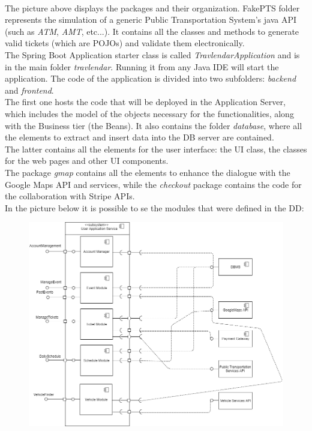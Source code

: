\documentclass{article}
\begin{document}
			\paragraph{}
The picture above displays the packages and their organization. FakePTS folder represents the simulation of a generic Public Transportation System's java API (such as \textit{ATM}, \textit{AMT}, etc...). It contains all the classes and methods to generate valid tickets (which are POJOs) and validate them electronically.\\ The Spring Boot Application starter class is called \textit{TravlendarApplication} and is in the main folder \textit{travlendar}. Running it from any Java IDE will start the application. The code of the application is divided into two subfolders: \textit{backend} and \textit{frontend}.\\The first one hosts the code that will be deployed in the Application Server, which includes the model of the objects necessary for the functionalities, along with the Business tier (the Beans). It also contains the folder \textit{database}, where all the elements to extract and insert data into the DB server are contained.\\The latter contains all the elements for the user interface: the UI class, the classes for the web pages and other UI components.\\The package \textit{gmap} contains all the elements to enhance the dialogue with the Google Maps API and services, while the \textit{checkout} package contains the code for the collaboration with Stripe APIs.\\In the picture below it is possible to se the modules that were defined in the DD:
 		\begin{figure}[H]
		\includegraphics[width=\linewidth]{Images/Architecture/User_Application_Service.png}
		\label{fig:Modules}
		\end{figure}
\end{document}
